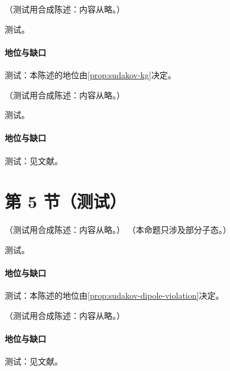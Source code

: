 \begin{corollary}\label{cor:sudakov-exponentiation}
（测试用合成陈述：内容从略。）
\end{corollary}
\begin{proofsketch}测试。\end{proofsketch}
\paragraph{地位与缺口}测试：本陈述的地位由\cref{prop:sudakov-kg}决定。

\begin{proposition}\label{prop:sudakov-webs}
（测试用合成陈述：内容从略。）
\end{proposition}
\begin{proofsketch}测试。\end{proofsketch}
\paragraph{地位与缺口}测试：见文献。

\section{第 5 节（测试）}\label{sec:sudakov-multileg}

\begin{theorem}\label{thm:sudakov-ir-poles}
（测试用合成陈述：内容从略。）
（本命题只涉及部分子态。）
\end{theorem}
\begin{proofsketch}测试。\end{proofsketch}
\paragraph{地位与缺口}测试：本陈述的地位由\cref{prop:sudakov-dipole-violation}决定。

\begin{proposition}\label{prop:sudakov-dipole-violation}
（测试用合成陈述：内容从略。）
\end{proposition}
\paragraph{地位与缺口}测试：见文献。

